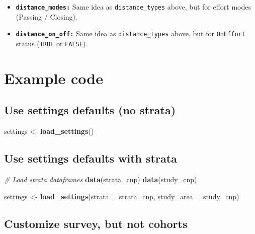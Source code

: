\documentclass[
]{book}
\newenvironment{Shaded}{\begin{snugshade}}{\end{snugshade}}
\newcommand{\CommentTok}[1]{\textcolor[rgb]{0.56,0.35,0.01}{\textit{#1}}}
\newcommand{\DataTypeTok}[1]{\textcolor[rgb]{0.13,0.29,0.53}{#1}}
\newcommand{\KeywordTok}[1]{\textcolor[rgb]{0.13,0.29,0.53}{\textbf{#1}}}
\newcommand{\NormalTok}[1]{#1}
\newcommand{\StringTok}[1]{\textcolor[rgb]{0.31,0.60,0.02}{#1}}
\begin{document}
\begin{itemize}
\item
  \textbf{\texttt{distance\_modes:}} Same idea as \texttt{distance\_types} above, but for effort modes (Passing / Closing).
\item
  \textbf{\texttt{distance\_on\_off:}} Same idea as \texttt{distance\_types} above, but for \texttt{OnEffort} status (\texttt{TRUE} or \texttt{FALSE}).
\end{itemize}

\hypertarget{example-code}{%
\section*{Example code}\label{example-code}}

\hypertarget{use-settings-defaults-no-strata}{%
\subsection*{Use settings defaults (no strata)}\label{use-settings-defaults-no-strata}}

\begin{Shaded}
\begin{Highlighting}[]
\NormalTok{settings <-}\StringTok{ }\KeywordTok{load_settings}\NormalTok{()}
\end{Highlighting}
\end{Shaded}

\hypertarget{use-settings-defaults-with-strata}{%
\subsection*{Use settings defaults with strata}\label{use-settings-defaults-with-strata}}

\begin{Shaded}
\begin{Highlighting}[]
\CommentTok{# Load strata dataframes}
\KeywordTok{data}\NormalTok{(strata_cnp)}
\KeywordTok{data}\NormalTok{(study_cnp)}

\NormalTok{settings <-}\StringTok{ }\KeywordTok{load_settings}\NormalTok{(}\DataTypeTok{strata =}\NormalTok{ strata_cnp,}
                          \DataTypeTok{study_area =}\NormalTok{ study_cnp)}
\end{Highlighting}
\end{Shaded}

\hypertarget{customize-survey-but-not-cohorts}{%
\subsection*{Customize survey, but not cohorts}\label{customize-survey-but-not-cohorts}}
\end{document}
